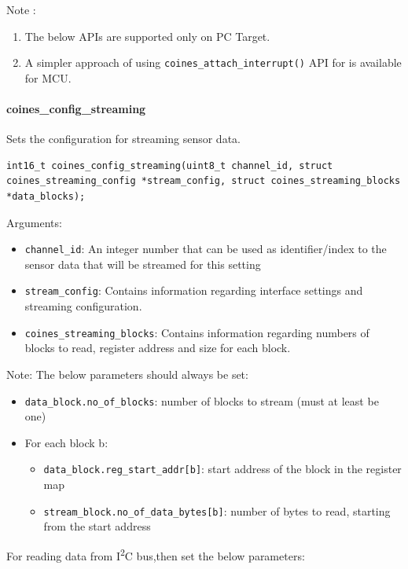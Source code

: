 Note :
\begin{enumerate}
\item The below APIs are supported only on PC Target.
\item A simpler approach of using \texttt{coines\_attach\_interrupt()} API for is available for MCU.
\end{enumerate}


\paragraph{coines\_config\_streaming}
Sets the configuration for streaming sensor data.

\begin{lstlisting}
int16_t coines_config_streaming(uint8_t channel_id, struct coines_streaming_config *stream_config, struct coines_streaming_blocks *data_blocks); 
\end{lstlisting}

Arguments:
\begin{itemize}
\item \texttt{channel\_id}: An integer number that can be used as identifier/index to the sensor data that will be streamed for this setting

\item \texttt{stream\_config}: Contains information regarding interface settings and streaming configuration.
\item  \texttt{coines\_streaming\_blocks}: Contains information regarding numbers of blocks to read, register address and size for each block.
\end{itemize}
Note:\newline
The below parameters should always be set:
	\begin{itemize}
		\item \texttt{data\_block.no\_of\_blocks}: number of blocks to stream (must at least be one)
		\item For each block b:
		\begin{itemize}
			\item \texttt{data\_block.reg\_start\_addr[b]}: start address of the block in the register map
			\item \texttt{stream\_block.no\_of\_data\_bytes[b]}: number of bytes to read, starting from the start address
		\end{itemize}
	\end{itemize}

For reading data from I\textsuperscript{2}C bus,then set the below parameters:
	
